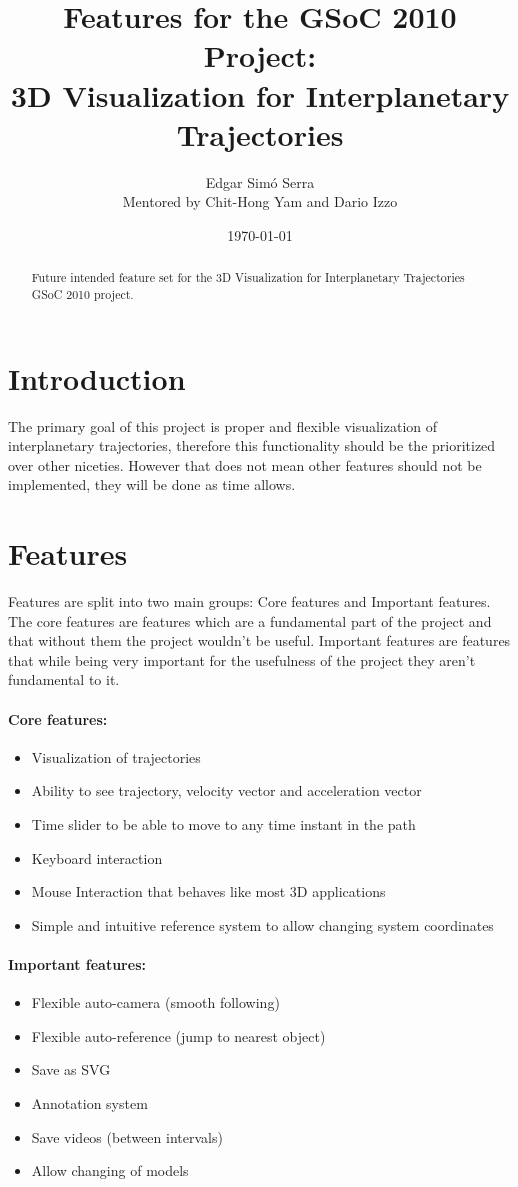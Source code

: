 \documentclass[a4paper,11pt]{article}
\title{Features for the GSoC 2010 Project:\\
       3D Visualization for Interplanetary Trajectories}
\author{
      Edgar Sim\'{o} Serra \\
      Mentored by Chit-Hong Yam and Dario Izzo 
}
\date{\today}
\begin{document}
\maketitle

\begin{abstract}
Future intended feature set for the 3D Visualization for Interplanetary Trajectories GSoC 2010 project.
\end{abstract}


\section{Introduction}
The primary goal of this project is proper and flexible visualization of interplanetary trajectories, therefore this functionality should be the prioritized over other niceties. However that does not mean other features should not be implemented, they will be done as time allows.


\section{Features}

Features are split into two main groups: Core features and Important features. The core features are features which are a fundamental part of the project and that without them the project wouldn't be useful. Important features are features that while being very important for the usefulness of the project they aren't fundamental to it.

\paragraph{Core features:}
\begin{itemize}
\item Visualization of trajectories
\item Ability to see trajectory, velocity vector and acceleration vector
\item Time slider to be able to move to any time instant in the path
\item Keyboard interaction
\item Mouse Interaction that behaves like most 3D applications
\item Simple and intuitive reference system to allow changing system coordinates
\end{itemize}

\paragraph{Important features:}
\begin{itemize}
\item Flexible auto-camera (smooth following)
\item Flexible auto-reference (jump to nearest object)
\item Save as SVG
\item Annotation system
\item Save videos (between intervals)
\item Allow changing of models
\end{itemize}
\end{document}
